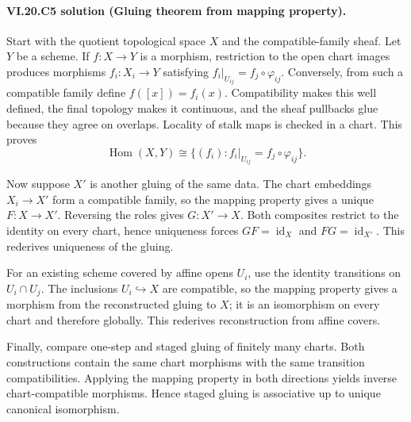 \paragraph{VI.20.C5 solution (Gluing theorem from mapping property).}
\begin{solution}
Start with the quotient topological space $X$ and the compatible-family sheaf.  Let $Y$ be a scheme.  If $f:X\to Y$ is a morphism, restriction to the open chart images produces morphisms $f_i:X_i\to Y$ satisfying $f_i|_{U_{ij}}=f_j\circ\varphi_{ij}$.  Conversely, from such a compatible family define $f([x])=f_i(x)$.  Compatibility makes this well defined, the final topology makes it continuous, and the sheaf pullbacks glue because they agree on overlaps.  Locality of stalk maps is checked in a chart.  This proves
\[
\operatorname{Hom}(X,Y)
\cong
\{(f_i): f_i|_{U_{ij}}=f_j\circ\varphi_{ij}\}.
\]

Now suppose $X'$ is another gluing of the same data.  The chart embeddings $X_i\to X'$ form a compatible family, so the mapping property gives a unique $F:X\to X'$.  Reversing the roles gives $G:X'\to X$.  Both composites restrict to the identity on every chart, hence uniqueness forces $GF=\operatorname{id}_X$ and $FG=\operatorname{id}_{X'}$.  This rederives uniqueness of the gluing.

For an existing scheme covered by affine opens $U_i$, use the identity transitions on $U_i\cap U_j$.  The inclusions $U_i\hookrightarrow X$ are compatible, so the mapping property gives a morphism from the reconstructed gluing to $X$; it is an isomorphism on every chart and therefore globally.  This rederives reconstruction from affine covers.

Finally, compare one-step and staged gluing of finitely many charts.  Both constructions contain the same chart morphisms with the same transition compatibilities.  Applying the mapping property in both directions yields inverse chart-compatible morphisms.  Hence staged gluing is associative up to unique canonical isomorphism.
\end{solution}
